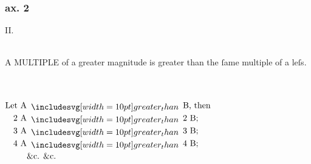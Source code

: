 \begin{center}
\begin{minipage}{0.80\textwidth}
        \hfill

        \hfill

        \subsubsection{ax. 2}
        II.\label{book5ax2}\\
        \hfill\\
        {\raggedright A \textsc{MULTIPLE} of a greater magnitude is greater than the ſame multiple of a leſs.}\\
        \hfill\\
        $\begin{aligned}
                \text{Let A} & \bgt \text{B, then} \\
                \text{2 A}   & \bgt \text{2 B;}    \\
                \text{3 A}   & \bgt \text{3 B;}    \\
                \text{4 A}   & \bgt \text{4 B;}    \\
                             & \text{\&c. \&c.}
            \end{aligned}$
    \end{minipage}%
\end{center}

\hfill

